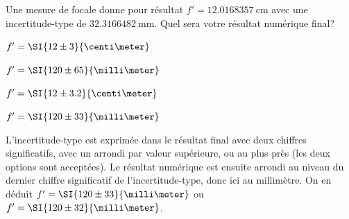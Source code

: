 
\hauteurLargeurCadreReponse		{6mm}{1.6cm}
\initialisationEntrainement



\debutEntrainement


\begin{enonce}
  Une mesure de focale donne pour résultat $f'=\SI{12.0168357}{\centi\meter}$ avec une incertitude-type de $\SI{32.3166482}{\milli\meter}$. Quel sera votre résultat numérique final?
  
    \begin{listeQCM2Colonnes}
    \item $f'=\SI{12\pm 3}{\centi\meter}$
    \item $f'=\SI{120\pm 65}{\milli\meter}$
    \item $f'=\SI{12\pm 3.2}{\centi\meter}$
    \item $f'=\SI{120\pm 33}{\milli\meter}$
    \end{listeQCM2Colonnes}
  \medskip
\end{enonce}


\begin{corrigeNewpage}
L'incertitude-type est exprimée dans le résultat final avec deux chiffres significatifs, avec un arrondi par valeur supérieure, ou au plus près (les deux options sont acceptées). Le résultat numérique est ensuite arrondi au niveau du dernier chiffre significatif de l'incertitude-type, donc ici au millimètre. On en déduit $f'=\SI{120\pm 33}{\milli\meter}$ ou $f'=\SI{120\pm 32}{\milli\meter}$.
\end{corrigeNewpage}

